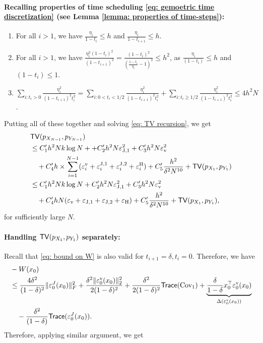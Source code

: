 \documentclass{article}
\theoremstyle{plain}
\theoremstyle{definition}
\theoremstyle{remark}
\def\Norm#1{\Vert#1\Vert}
\def\tr{{\sf tr}}
\def\TV{{\sf TV}}
\def\Cov{\text{Cov}}
\def\evel{\varepsilon^{\rm v}}
\def\meanevel{\varepsilon_{\rm v}}
\def\evelJone{\varepsilon^{\rm J,1}}
\def\meanevelJone{\varepsilon_{\rm J,1}}
\def\evelJtwo{\varepsilon^{\rm J,2}}
\def\meanevelJtwo{\varepsilon_{\rm J,2}}
\def\evelH{\varepsilon^{\rm H}}
\def\meanevelH{\varepsilon_{\rm H}}
\def\tr{{\sf Trace}}
\begin{document}
\paragraph{Recalling properties of  time scheduling \eqref{eq: gemoetric time discretization} (see Lemma \ref{lemma: properties of time-steps}):}
\begin{enumerate}  
    \item For all $i>1$, we have $\frac{\eta_i}{1-t_i} \le h$ and $\frac{\eta_i}{1-t_{i+1}} \le h$.
    
     \item For all $i>1$, we have $\frac{ \eta_i^2 (1-t_i)^2 }{(1-t_{i+1})^2} = \frac{(1-t_i)^2}{(\frac{1-t_i}{\eta_i} - 1)^2} \le  h^2 $, as $\frac{\eta_i}{(1-t_i)} \le h$ and $(1-t_i) \le 1$.
     
     \item $\sum_{i : t_i >0}\frac{ \eta_i^2 }{(1-t_{i+1})^2 t_i^2} = \sum_{i: 0 < t_{i} < 1/2 }\frac{ \eta_i^2 }{(1-t_{i+1})^2 t_i^2} + \sum_{i: t_{i}\ge 1/2 }\frac{ \eta_i^2 }{(1-t_{i+1})^2 t_i^2} \le 4 h^2 N$.
\end{enumerate}


Putting all of these together and solving \eqref{eq: TV recursion}, we get
\begin{equation*}
    \begin{aligned}
        & \TV(p_{X_{N-1}}, p_{Y_{N-1}})\\
        & \le C_1^\prime h^2 N k \log N + + C_2^\prime h^2  N \meanevelJone^2 + C_3^\prime h^2 N\meanevel^2 \\
        & \quad + C_4^\prime h \times \sum_{i = 1}^{N-1} (\evel_i + \evelJone_i + \evelJtwo_i + \evelH_i) + C_5^\prime \frac{h^2}{\delta^2 N^{10}} + \TV(p_{X_1}, p_{Y_1})\\
        & \le C_1^\prime h^2 N k \log N  + C_2^\prime h^2  N \meanevelJone^2 + C_3^\prime h^2 N\meanevel^2 \\
        & \quad + C_4^\prime h N (\meanevel + \meanevelJone + \meanevelJtwo + \meanevelH) + C_5^\prime \frac{h^2}{\delta^2 N^{10}}+ \TV(p_{X_1}, p_{Y_1}),
    \end{aligned}
\end{equation*}
for sufficiently large $N$.
\paragraph{Handling $\TV(p_{X_1}, p_{Y_1})$ separately:}
Recall that \eqref{eq: bound on W} is also valid for $t_{i+1} = \delta, t_i = 0$. Therefore, we have 
\begin{align*}
& - W(x_0) \\
& \le \frac{4 \delta^2 }{(1-\delta)^2} \Norm{\varepsilon_0^J(x_0)}_F^2 + \frac{\delta^2 \Norm{\varepsilon_0^{\rm v}(x_0)}_2^2}{2(1-\delta)^2}  +  \frac{\delta^2}{2(1-\delta)^2} \tr(\Cov_{1} ) + \underbrace{\frac{\delta}{1 - \delta} x_0 ^\top \varepsilon_0^{\rm v}(x_0)}_{\Delta(\varepsilon_0^{\rm v}(x_0))}\\
& \quad - \frac{\delta^2 }{(1-\delta)} \tr(\varepsilon_0^J(x_0)). 
\end{align*}
Therefore, applying similar argument, we get 
\end{document}
